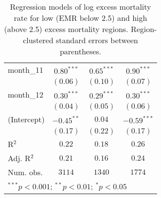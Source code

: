 \begin{table}[h!]
\begin{center}
\begin{small}
\begin{tabular}{l c c c}
month\_11      & $0.80^{***}$  & $0.65^{***}$  & $0.90^{***}$  \\
               & $(0.06)$      & $(0.10)$      & $(0.07)$      \\
month\_12      & $0.30^{***}$  & $0.29^{***}$  & $0.30^{***}$  \\
               & $(0.04)$      & $(0.05)$      & $(0.06)$      \\
(Intercept)    & $-0.45^{**}$  & $0.04$        & $-0.59^{***}$ \\
               & $(0.17)$      & $(0.22)$      & $(0.17)$      \\
\hline
R$^2$          & $0.22$        & $0.18$        & $0.26$        \\
Adj. R$^2$     & $0.21$        & $0.16$        & $0.24$        \\
Num. obs.      & $3114$        & $1340$        & $1774$        \\
\hline
\multicolumn{4}{l}{\tiny{$^{***}p<0.001$; $^{**}p<0.01$; $^{*}p<0.05$}}
\end{tabular}
\end{small}
\caption{Regression models of log excess mortality rate for low (EMR below 2.5) and high (above 2.5) excess mortality regions. Region-clustered standard errors between parentheses.}
\label{tab:hilomodels}
\end{center}
\end{table}
